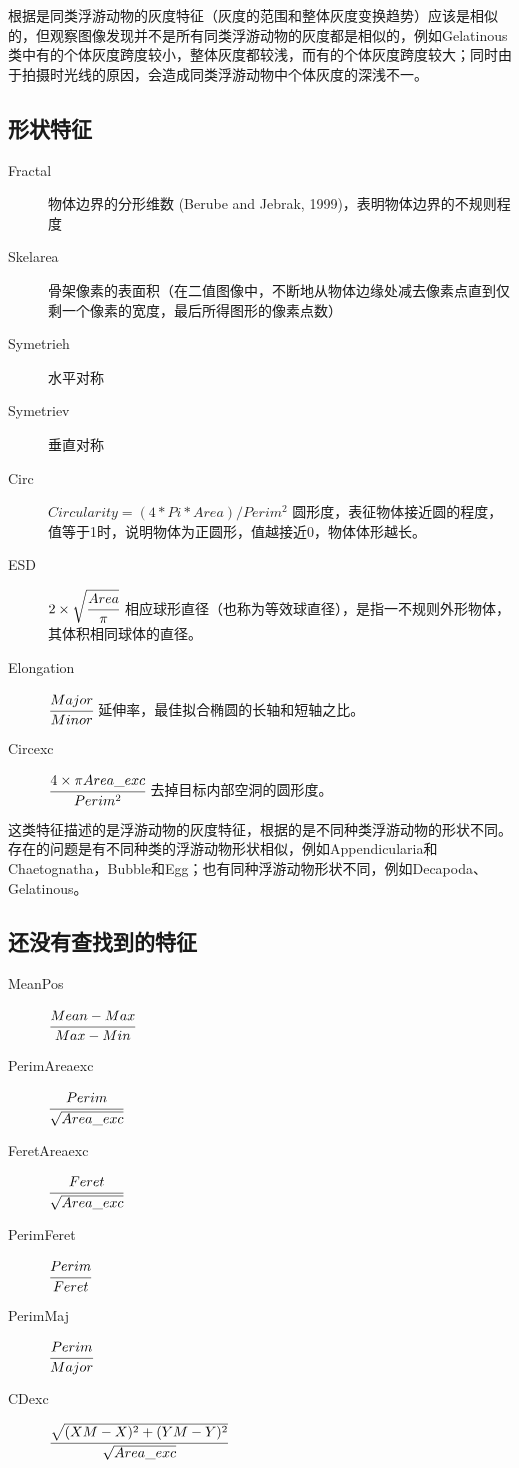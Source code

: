 根据是同类浮游动物的灰度特征（灰度的范围和整体灰度变换趋势）应该是相似的，但观察图像发现并不是所有同类浮游动物的灰度都是相似的，例如Gelatinous类中有的个体灰度跨度较小，整体灰度都较浅，而有的个体灰度跨度较大；同时由于拍摄时光线的原因，会造成同类浮游动物中个体灰度的深浅不一。

\subsection{形状特征}

\begin{description}
    \item[Fractal] 物体边界的分形维数 (Berube and Jebrak, 1999)，表明物体边界的不规则程度
    \item[Skelarea] 骨架像素的表面积（在二值图像中，不断地从物体边缘处减去像素点直到仅剩一个像素的宽度，最后所得图形的像素点数）
    \item[Symetrieh] 水平对称
    \item[Symetriev] 垂直对称
    \item[Circ] $Circularity = (4 * Pi * Area) / Perim^2$ 圆形度，表征物体接近圆的程度，值等于1时，说明物体为正圆形，值越接近0，物体体形越长。
    \item[ESD] $2 \times \sqrt{\cfrac{Area}{\pi}}$ 相应球形直径（也称为等效球直径），是指一不规则外形物体，其体积相同球体的直径。
    \item[Elongation] $\cfrac{Major}{Minor}$ 延伸率，最佳拟合椭圆的长轴和短轴之比。
    \item[Circexc] $\cfrac{4 \times \pi Area\_exc}{Perim^{2}}$ 去掉目标内部空洞的圆形度。
\end{description}

这类特征描述的是浮游动物的灰度特征，根据的是不同种类浮游动物的形状不同。存在的问题是有不同种类的浮游动物形状相似，例如Appendicularia和Chaetognatha，Bubble和Egg；也有同种浮游动物形状不同，例如Decapoda、Gelatinous。

\subsection{还没有查找到的特征}
\begin{description}
    \item[MeanPos] $\cfrac{Mean-Max}{Max-Min}$
    \item[PerimAreaexc] $\cfrac{Perim}{\sqrt{Area\_exc}}$ 
    \item[FeretAreaexc] $\cfrac{Feret}{\sqrt{Area\_exc}}$
    \item[PerimFeret] $\cfrac{Perim}{Feret}$
    \item[PerimMaj] $\cfrac{Perim}{Major}$
    \item[CDexc] $\cfrac{\sqrt{(XM-X)^{2}+(YM-Y)^{2}}}{{\sqrt{Area\_exc}}}$ 
\end{description}


